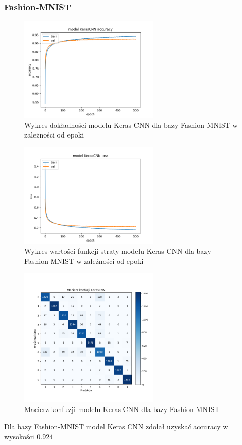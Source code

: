 \documentclass{article}
\begin{document}
\subsubsection{Fashion-MNIST}
\begin{figure}[H]
    \centering
    \includegraphics[width=0.6\textwidth]{../Saves/KerasCNN/fashion-mnist/KerasCNN_fashion-mnist_ep500_acc.png}
    \caption{Wykres dokładności modelu Keras CNN dla bazy Fashion-MNIST w zależności od epoki}
\end{figure}

\begin{figure}[H]
    \centering
    \includegraphics[width=0.6\textwidth]{../Saves/KerasCNN/fashion-mnist/KerasCNN_fashion-mnist_ep500_loss.png}
    \caption{Wykres wartości funkcji straty modelu Keras CNN dla bazy Fashion-MNIST w zależności od epoki}
\end{figure}

\begin{figure}[H]
	\centering
	\includegraphics[width=0.6\textwidth]{../Saves/KerasCNN/fashion-mnist/KerasCNN_fashion-mnist_conf_mat.png}
	\caption{Macierz konfuzji modelu Keras CNN dla bazy Fashion-MNIST}
\end{figure}
Dla bazy Fashion-MNIST model Keras CNN zdołał uzyskać accuracy w wysokości $0.924$
\end{document}

